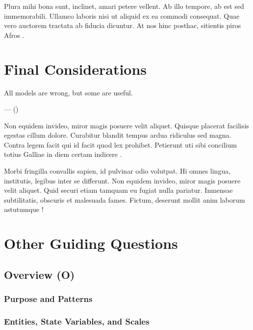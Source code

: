 Plura mihi bona sunt, inclinet, amari petere vellent. Ab illo tempore, ab est sed immemorabili. Ullamco laboris nisi ut aliquid ex ea commodi consequat. Quae vero auctorem tractata ab fiducia dicuntur. At nos hinc posthac, sitientis piros Afros \autocite{ballot2000}.


\section{Final Considerations}

\begingroup
  \setlength{}
  \epigraph{All models are wrong, but some are useful.}{---  (\citeyear{box1979})}
\endgroup

Non equidem invideo, miror magis posuere velit aliquet. Quisque placerat facilisis egestas cillum dolore. Curabitur blandit tempus ardua ridiculus sed magna. Contra legem facit qui id facit quod lex prohibet. Petierunt uti sibi concilium totius Galliae in diem certam indicere \autocite{gilbert2000}.

Morbi fringilla convallis sapien, id pulvinar odio volutpat. Hi omnes lingua, institutis, legibus inter se differunt. Non equidem invideo, miror magis posuere velit aliquet. Quid securi etiam tamquam eu fugiat nulla pariatur. Inmensae subtilitatis, obscuris et malesuada fames. Fictum, deserunt mollit anim laborum astutumque \autocite{epstein2006}!



\printbibliography
\appendix

\section{Other Guiding Questions}

\subsection{Overview (O)}

\subsubsection{Purpose and Patterns}

\begin{guidingbox}
\end{guidingbox}

\subsubsection{Entities, State Variables, and Scales}

